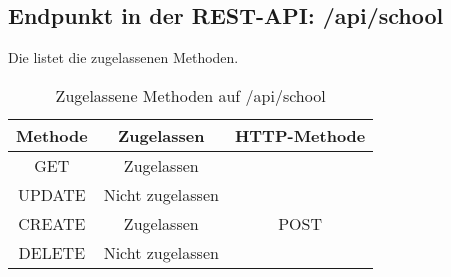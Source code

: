 \subsection{Endpunkt in der REST-API: /api/school}
Die  listet die zugelassenen Methoden. 

\begin{table}[!htbp]
	\begin{tabular}{|c|c|c|}
		\hline
			\textbf{Methode} & \textbf{Zugelassen} & \textbf{HTTP-Methode} \\ \hline
			GET & Zugelassen &  \\ \hline
			UPDATE & Nicht zugelassen & \\ \hline 
			CREATE & Zugelassen & POST \\ \hline  
			DELETE & Nicht zugelassen & \\ \hline
	\end{tabular}

		\caption{Zugelassene Methoden auf /api/school}
		\label{tab:end:rest:api:school:meth}
\end{table}